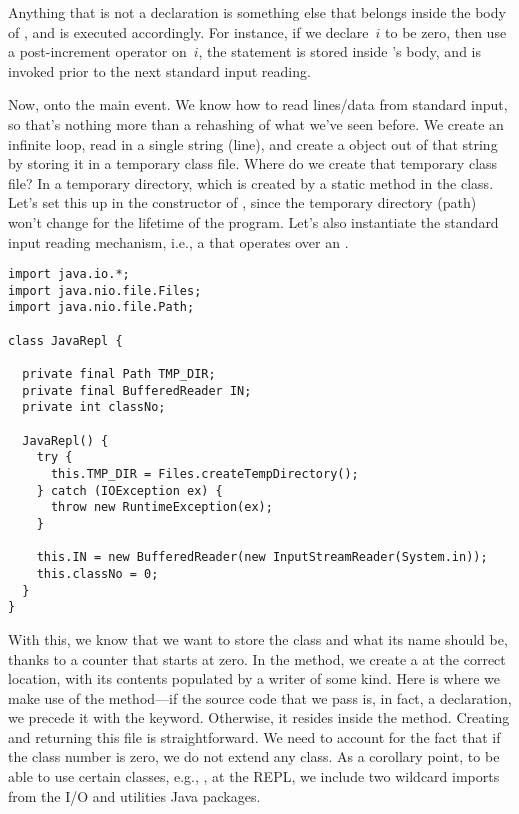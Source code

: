 Anything that is not a declaration is something else that belongs inside the body of , and is executed accordingly. 
For instance, if we declare~$i$ to be zero, then use a post-increment operator on~$i$, the  statement is stored inside 's  body, and is invoked prior to the next standard input reading. 

Now, onto the main event. 
We know how to read lines/data from standard input, so that's nothing more than a rehashing of what we've seen before. 
We create an infinite loop, read in a single string (line), and create a  object out of that string by storing it in a temporary class file. 
Where do we create that temporary class file? 
In a temporary directory, which is created by a static method in the class. 
Let's set this up in the constructor of , since the temporary directory (path) won't change for the lifetime of the program. 
Let's also instantiate the standard input reading mechanism, i.e., a  that operates over an .

\begin{lstlisting}[language=MyJava]
import java.io.*;
import java.nio.file.Files;
import java.nio.file.Path;

class JavaRepl {

  private final Path TMP_DIR;
  private final BufferedReader IN; 
  private int classNo;

  JavaRepl() {
    try {
      this.TMP_DIR = Files.createTempDirectory();
    } catch (IOException ex) {
      throw new RuntimeException(ex);
    } 
    
    this.IN = new BufferedReader(new InputStreamReader(System.in));
    this.classNo = 0;
  }
}
\end{lstlisting}

With this, we know that we want to store the class and what its name should be, thanks to a counter that starts at zero. 
In the  method, we create a  at the correct location, with its contents populated by a writer of some kind. 
Here is where we make use of the  method---if the source code that we pass is, in fact, a declaration, we precede it with the  keyword. 
Otherwise, it resides inside the  method. 
Creating and returning this file is straightforward. 
We need to account for the fact that if the class number is zero, we do not extend any class.
As a corollary point, to be able to use certain classes, e.g., , at the REPL, we include two wildcard imports from the I/O and utilities Java packages.

